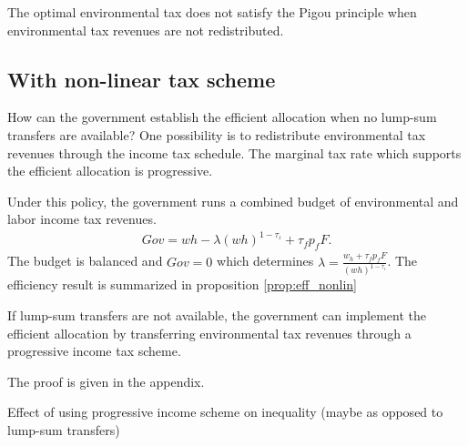\begin{prop}
	The optimal environmental tax does not satisfy the Pigou principle when environmental tax revenues are not redistributed. 
\end{prop}


\subsection{With non-linear tax scheme}
How can the government establish the efficient allocation when no lump-sum transfers are available? One possibility is to redistribute environmental tax revenues through the income tax schedule. The marginal tax rate which supports the efficient allocation is progressive. 

Under this policy, the government runs a combined budget of environmental and labor income tax revenues.  
\begin{align}
Gov= wh-\lambda (wh)^{1-\tau_\iota}+\tau_f p_fF.
\end{align}
The budget is balanced and $Gov = 0$ which determines $\lambda=\frac{w_h + \tau_f p_f F}{(wh)^{1-\tau_{\iota}}}$. The efficiency result is summarized in proposition \ref{prop:eff_nonlin}
\begin{prop}\label{prop:eff_nonlin}
	If lump-sum transfers are not available, the government can implement the efficient allocation by  transferring environmental tax revenues through a progressive income tax scheme.
\end{prop}
The proof is given in the appendix. 

\begin{prop}
Effect of using progressive income scheme on inequality (maybe as opposed to lump-sum transfers)
\end{prop}

